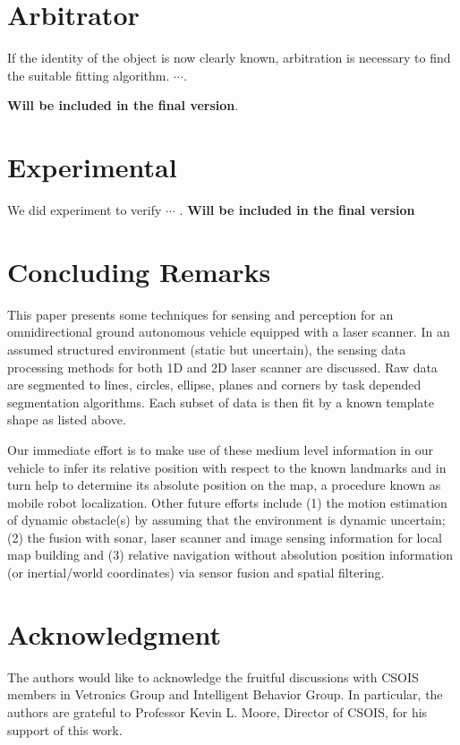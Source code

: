 \documentclass{cdcarta4}
\begin{document}
\section{Arbitrator}
If the identity of the object is now clearly known, arbitration is necessary to find the suitable fitting algorithm. $\cdots$.

{\bf Will be included in the final version}.

\section{Experimental}
We did experiment to verify $\cdots$ .
{\bf Will be included in the final version}

\section{{Concluding Remarks}}  
\label{sec6}
   
This paper presents some techniques for sensing and perception for an
omnidirectional ground autonomous vehicle equipped with a laser scanner. In an
assumed structured environment (static but uncertain), the sensing data processing methods for both 1D
and 2D laser scanner are discussed. Raw data are segmented to lines, circles,
ellipse, planes and corners by task depended segmentation algorithms.  Each
subset of data is then fit by a known template shape as listed above.  

Our immediate effort is to make use of these medium level information in our  vehicle to infer its relative position with respect to the known landmarks and in turn help to determine its absolute
position on the map, a procedure known as mobile robot localization.
Other future efforts include (1) the motion estimation of dynamic obstacle(s) by assuming that the environment is dynamic uncertain; (2) the fusion with sonar, laser scanner and image sensing information for local map building and
 (3)  relative navigation  without  absolution position information (or inertial/world coordinates) via sensor fusion and spatial filtering.





\section*{Acknowledgment}
The authors would like to acknowledge the fruitful discussions with 
CSOIS members in Vetronics Group and Intelligent Behavior Group. In particular, 
  the authors are grateful to Professor Kevin L. Moore,  Director of CSOIS, for his   support  of this work.
 

 
\end{document}
